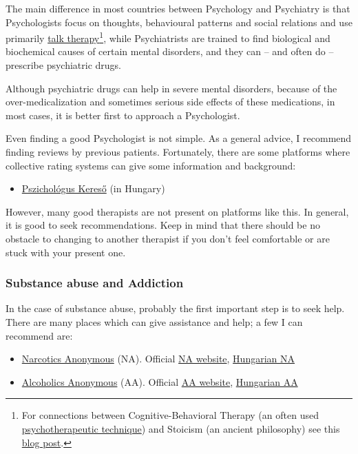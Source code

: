 \documentclass{article}
\begin{document}
The main difference in most countries between Psychology and Psychiatry is that Psychologists focus on thoughts, behavioural patterns and social relations and use primarily \href{https://www.nimh.nih.gov/health/topics/psychotherapies}{talk therapy}\footnote{For connections between Cognitive-Behavioral Therapy (an often used \href{https://www.healthline.com/health/mental-health/talk-therapy}{psychotherapeutic technique}) and Stoicism (an ancient philosophy) see this \href{https://medium.com/stoicism-philosophy-as-a-way-of-life/stoic-philosophy-as-a-cognitive-behavioral-therapy-597fbeba786a}{blog post}.}, while Psychiatrists are trained to find biological and biochemical causes of certain mental disorders, and they can -- and often do -- prescribe psychiatric drugs.

Although psychiatric drugs can help in severe mental disorders, because of the over-medicalization and sometimes serious side effects of these medications, in most cases, it is better first to approach a Psychologist.

Even finding a good Psychologist is not simple. As a general advice, I recommend finding reviews by previous patients. Fortunately, there are some platforms where collective rating systems can give some information and background:

\begin{itemize}
    \item \href{https://pszichologuskereso.hu/}{Pszichológus Kereső} (in Hungary)
\end{itemize}

However, many good therapists are not present on platforms like this. In general, it is good to seek recommendations. Keep in mind that there should be no obstacle to changing to another therapist if you don't feel comfortable or are stuck with your present one.

\subsubsection{Substance abuse and Addiction}

In the case of substance abuse, probably the first important step is to seek help. There are many places which can give assistance and help; a few I can recommend are:

\begin{itemize}
    \item \href{https://en.wikipedia.org/wiki/Narcotics_Anonymous}{Narcotics Anonymous} (NA). Official \href{https://na.org/}{NA website}, \href{https://nahungary.hu/}{Hungarian NA}
    \item \href{https://en.wikipedia.org/wiki/Alcoholics_Anonymous}{Alcoholics Anonymous} (AA). Official \href{https://www.aa.org/}{AA website}, \href{https://www.anonimalkoholistak.hu/}{Hungarian AA}
\end{itemize}
\end{document}
